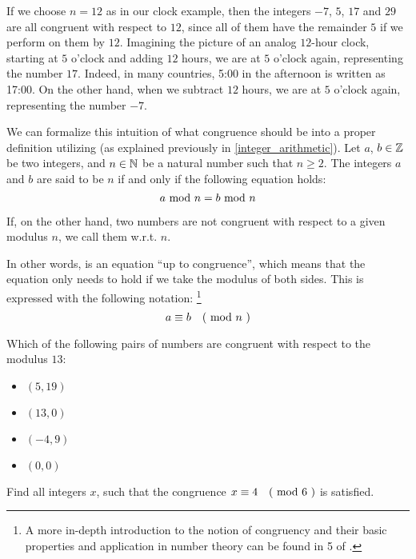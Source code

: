 \begin{example}
If we choose $n=12$ as in our clock example, then the integers $-7$, $5$, $17$ and $29$ are all congruent with respect to $12$, since all of them have the remainder $5$ if we perform  on them by $12$. Imagining the picture of an analog $12$-hour clock, starting at $5$ o'clock and adding  $12$ hours, we are at $5$ o'clock again, representing the number $17$. Indeed, in many countries, 5:00 in the afternoon is written as 17:00. On the other hand, when we subtract $12$ hours, we are at $5$ o'clock again, representing the number $-7$.
\end{example}
We can formalize this intuition of what congruence should be into a proper definition utilizing  (as explained previously in \ref{integer_arithmetic}). Let $ a $, $ b \in \mathbb{Z} $ be two integers, and $ n \in \mathbb{N} $ be a natural number such that $n\geq 2$. The integers $ a $ and $ b $ are said to be  $ n $ if and only if the following equation holds:
\begin{equation}
a \text{ mod } n = b \text{ mod } n
\end{equation}

If, on the other hand, two numbers are not congruent with respect to a given modulus $n$, we call them  w.r.t. $n$.

In other words,  is an equation ``up to congruence'', which means that the equation only needs to hold if we take the modulus of both sides. This is expressed with the following notation:
\footnote{A more in-depth introduction to the notion of congruency and their basic properties and
application in number theory can be found in \chaptname{} 5 of \cite{hardy-2008}.}
\begin{equation}
a \equiv b \quad \text{( mod } n \text{ )}
\end{equation}
\begin{exercise}
Which of the following pairs of numbers are congruent with respect to the modulus $13$:
\begin{itemize}\compactlist
\item $(5,19)$
\item $(13,0)$
\item $(-4,9)$
\item $(0,0)$
\end{itemize}
\end{exercise}
\begin{exercise}
Find all integers $x$, such that the congruence $x \equiv 4 \quad \text{( mod } 6 \text{ )}$ is satisfied.
\end{exercise}
